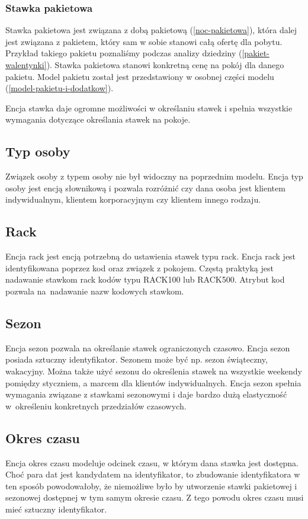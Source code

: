 \documentclass[a4paper,onecolumn,oneside,11pt,wide,floatssmall]{mwrep}
\theoremstyle{definition}
\theoremstyle{plain}%
\theoremstyle{remark}
\begin{document}
\subsubsection{Stawka pakietowa}
Stawka pakietowa jest związana z dobą pakietową (\ref{noc-pakietowa}), która dalej jest związana z pakietem, który sam w sobie stanowi całą ofertę dla pobytu. Przykład takiego pakietu poznaliśmy podczas analizy dziedziny (\ref{pakiet-walentynki}). Stawka pakietowa stanowi konkretną cenę na pokój dla danego pakietu. Model pakietu został jest przedstawiony w osobnej części modelu (\ref{model-pakietu-i-dodatkow}).

Encja stawka daje ogromne możliwości w określaniu stawek i spełnia wszystkie wymagania dotyczące określania stawek na pokoje. 

\subsection{Typ osoby}
Związek osoby z typem osoby nie był widoczny na poprzednim modelu. Encja typ osoby jest encją słownikową i pozwala rozróżnić czy dana osoba jest klientem indywidualnym, klientem korporacyjnym czy klientem innego rodzaju. 

\subsection{Rack}
Encja rack jest encją potrzebną do ustawienia stawek typu rack. Encja rack jest identyfikowana poprzez kod oraz związek z pokojem. Częstą praktyką jest nadawanie stawkom rack kodów typu RACK100 lub RACK500. Atrybut kod pozwala \mbox{na nadawanie} nazw kodowych stawkom.

\subsection{Sezon}
Encja sezon pozwala na określanie stawek ograniczonych czasowo. Encja sezon posiada sztuczny identyfikator. Sezonem może być np. sezon świąteczny, wakacyjny. Można także użyć sezonu do określenia stawek na wszystkie weekendy pomiędzy styczniem, a marcem dla klientów indywidualnych. Encja sezon spełnia wymagania związane z stawkami sezonowymi i daje bardzo dużą elastyczność \mbox{w określeniu} konkretnych przedziałów czasowych.

\subsection{Okres czasu}
Encja okres czasu modeluje odcinek czasu, w którym dana stawka jest dostępna. Choć para dat jest kandydatem na identyfikator, to zbudowanie identyfikatora w ten sposób powodowałoby, że niemożliwe było by utworzenie stawki pakietowej i sezonowej dostępnej w tym samym okresie czasu. Z tego powodu okres czasu musi mieć sztuczny identyfikator.
\end{document}
